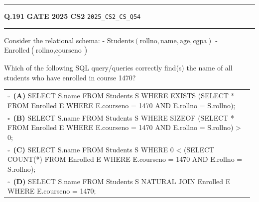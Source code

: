 \documentclass[a4paper,10pt]{article}
\begin{document}
\vspace{6pt}\hrule height 0.35pt\vspace{6pt}
\noindent
\begin{tcolorbox}[
    blanker,
    sidebyside,
    sidebyside align=top,
    lefthand width=0.55\textwidth,
    top=4pt, bottom=4pt, left=0pt, right=0pt,
    middle=16pt,
    underlay={
        \draw[dashed, black!80, line width=0.8pt, dash pattern=on 4pt off 3pt]
            ([xshift=0.55\textwidth+8pt]frame.north west) --
            ([xshift=0.55\textwidth+8pt]frame.south west);
    }
]
\textbf{Q.191}  \hfill {\footnotesize\textbf{GATE 2025 CS2} \quad \tiny\texttt{2025\_CS2\_CS\_Q54}}
\vspace{2pt}\hrule height 0.3pt\vspace{4pt}

Consider the relational schema:
- $\text{Students}(\underline{\text{rollno}}, \text{name}, \text{age}, \text{cgpa})$
- $\text{Enrolled}(\underline{\text{rollno}, \text{courseno}})$
\par\medskip
Which of the following SQL query/queries correctly find(s) the name of all students who have enrolled in course 1470?

\par\vspace{6pt}\noindent
\begin{tabular}{@{}p{0.98\linewidth}@{}}
$\square$\ \textbf{(A)} SELECT S.name \newline FROM Students S \newline WHERE EXISTS (SELECT * FROM Enrolled E WHERE E.courseno = 1470 AND E.rollno = S.rollno); \\
\addlinespace[3pt]
$\square$\ \textbf{(B)} SELECT S.name \newline FROM Students S \newline WHERE SIZEOF (SELECT * FROM Enrolled E WHERE E.courseno = 1470 AND E.rollno = S.rollno) > 0; \\
\addlinespace[3pt]
$\square$\ \textbf{(C)} SELECT S.name \newline FROM Students S \newline WHERE 0 < (SELECT COUNT(*) FROM Enrolled E WHERE E.courseno = 1470 AND E.rollno = S.rollno); \\
\addlinespace[3pt]
$\square$\ \textbf{(D)} SELECT S.name \newline FROM Students S NATURAL JOIN Enrolled E \newline WHERE E.courseno = 1470;
\end{tabular}


\end{tcolorbox}
\end{document}
